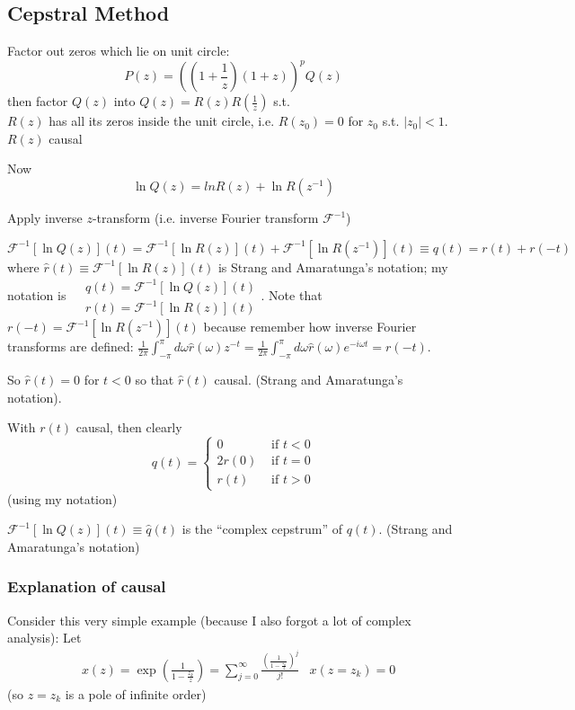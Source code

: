 \documentclass[twoside]{amsart}
\theoremstyle{plain}
\theoremstyle{definition}
\theoremstyle{remark}
\numberwithin{equation}{section}
\begin{document}
\subsection*{Cepstral Method}

Factor out zeros which lie on unit circle:
\[
P(z) = \left( \left( 1 + \frac{1}{z} \right)(1+z)\right)^p Q(z)
\]
then factor $Q(z)$ into $Q(z) = R(z)R(\frac{1}{z})$ s.t. \\
\phantom{then } $R(z)$ has all its zeros inside the unit circle, i.e. $R(z_0)=0$ for $z_0$ s.t. $|z_0|< 1$.  
\phantom{then }$R(z)$ causal 

Now 
\[
\ln{Q(z)} = ln{ R(z)} + \ln{ R(z^{-1}) }
\]

Apply inverse $z$-transform (i.e. inverse Fourier transform $\mathcal{F}^{-1}$)

\begin{equation}
\mathcal{F}^{-1}[\ln{ Q(z) }](t) = \mathcal{F}^{-1}[\ln{R(z)}](t) + \mathcal{F}^{-1}[\ln{R(z^{-1})}](t) \equiv q(t) = r(t) + r(-t)
\end{equation}
where $\widehat{r}(t) \equiv \mathcal{F}^{-1}[\ln{R(z)}](t)$ is Strang and Amaratunga's notation; my notation is $\begin{aligned}
& q(t) = \mathcal{F}^{-1}[\ln{ Q(z)}](t) \\ 
& r(t) = \mathcal{F}^{-1}[\ln{ R(z)}](t)
\end{aligned}$.  Note that $r(-t) = \mathcal{F}^{-1}[\ln{ R(z^{-1})}](t)$ because remember how inverse Fourier transforms are defined: $\frac{1}{2\pi} \int_{-\pi}^{\pi} d\omega \widehat{r}(\omega) z^{-t} = \frac{1}{2\pi} \int_{-\pi}^{\pi} d\omega \widehat{r}(\omega) e^{-i\omega t} = r(-t)$.  

So $\widehat{r}(t) = 0$ for $t<0$ so that $\widehat{r}(t)$ causal.  (Strang and Amaratunga's notation).  

With $r(t)$ causal, then clearly
\[
q(t) = \begin{cases} 0 & \text{ if } t < 0 \\
 2r(0) & \text{ if } t = 0 \\
 r(t) & \text{ if } t > 0 \end{cases}
\] (using my notation)

$\mathcal{F}^{-1}[\ln{Q(z)}](t) \equiv \widehat{q}(t)$ is the ``complex cepstrum'' of $q(t)$.  (Strang and Amaratunga's notation)

\subsubsection*{Explanation of causal} 
Consider this very simple example (because I also forgot a lot of complex analysis): Let
\[
\begin{aligned}
& x(z) = \exp{ \left( \frac{1}{ 1 - \frac{z_k}{z} } \right)} = \sum_{j=0}^{\infty} \frac{ \left( \frac{1}{ 1 - \frac{z_k}{z} } \right)^j }{j!}
& x(z=z_k) = 0 
\end{aligned}
\]
(so $z=z_k$ is a pole of infinite order)
\end{document}

